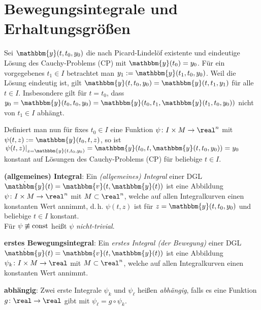 \pagebreak

\section{%
    Bewegungsintegrale und Erhaltungsgrößen%
}

Sei $\mathbbm{y}(t, t_0, y_0)$ die nach Picard-Lindelöf existente und
eindeutige Lösung des Cauchy-Problems (CP) mit $\mathbbm{y}(t_0) = y_0$.
Für ein vorgegebenes $t_1 \in I$ betrachtet man
$y_1 := \mathbbm{y}(t_1, t_0, y_0)$.
Weil die Lösung eindeutig ist, gilt
$\mathbbm{y}(t, t_0, y_0) = \mathbbm{y}(t, t_1, y_1)$ für alle $t \in I$.
Insbesondere gilt für $t = t_0$, dass
$y_0 = \mathbbm{y}(t_0, t_0, y_0) =
\mathbbm{y}(t_0, t_1, \mathbbm{y}(t_1, t_0, y_0))$
nicht von $t_1 \in I$ abhängt.

Definiert man nun für fixes $t_0 \in I$
eine Funktion $\psi\colon I \times M \rightarrow \real^n$
mit $\psi(t, z) := \mathbbm{y}(t_0, t, z)$, so ist
$\left.\psi(t, z)\right|_{z = \mathbbm{y}(t, t_0, y_0)} =
\mathbbm{y}(t_0, t, \mathbbm{y}(t, t_0, y_0)) = y_0$ konstant
auf Lösungen des Cauchy-Problems (CP) für beliebige $t \in I$.

\textbf{(allgemeines) Integral}:
Ein \emph{(allgemeines) Integral} einer DGL
$\dot{\mathbbm{y}}(t) = \mathbbm{v}(t, \mathbbm{y}(t))$ ist eine
Abbildung $\psi\colon I \times M \rightarrow \real^n$ mit $M \subset \real^n$,
welche auf allen Integralkurven einen konstanten Wert annimmt, d.\,h.
$\psi(t, z)$ ist für $z = \mathbbm{y}(t, t_0, y_0)$ und beliebige
$t \in I$ konstant. \\
Für $\psi \not\equiv \operatorname{const}$ heißt $\psi$ \emph{nicht-trivial}.

\textbf{erstes Bewegungsintegral}:
Ein \emph{erstes Integral (der Bewegung)} einer DGL
$\dot{\mathbbm{y}}(t) = \mathbbm{v}(t, \mathbbm{y}(t))$ ist eine
Abbildung $\psi_k\colon I \times M \rightarrow \real$ mit $M \subset \real^n$,
welche auf allen Integralkurven einen konstanten Wert annimmt.

\textbf{abhängig}:
Zwei erste Integrale $\psi_k$ und $\psi_\ell$ heißen \emph{abhängig},
falls es eine Funktion $g\colon \real \rightarrow \real$ gibt mit
$\psi_\ell = g \circ \psi_k$.

